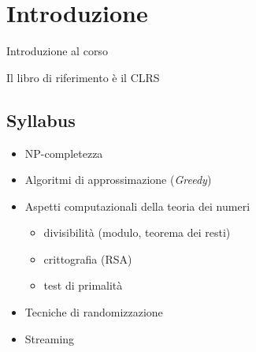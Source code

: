
\section{Introduzione}

Introduzione al corso

Il libro di riferimento è il CLRS \cite{Cormen:2009:IAT:1614191}

\subsection{Syllabus}

\begin{itemize}
    \item NP-completezza
    \item Algoritmi di approssimazione (\textit{Greedy})
    \item Aspetti computazionali della teoria dei numeri
        \begin{itemize}
            \item divisibilità (modulo, teorema dei resti)
            \item crittografia (RSA)
            \item test di primalità
        \end{itemize}
    \item Tecniche di randomizzazione
    \item Streaming
\end{itemize}

